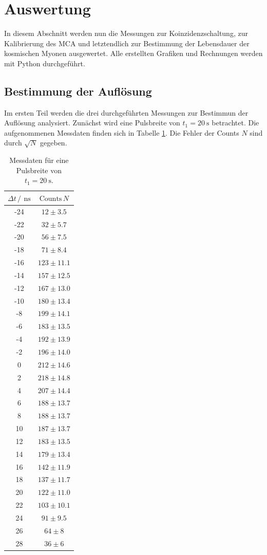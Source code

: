\section{Auswertung}
\label{sec:Auswertung}
In diesem Abschnitt werden nun die Messungen zur Koinzidenzschaltung, zur Kalibrierung des MCA und letztendlich zur Bestimmung der Lebensdauer der kosmischen Myonen ausgewertet.
Alle erstellten Grafiken und Rechnungen werden mit Python \cite{python} durchgeführt.
\subsection{Bestimmung der Auflösung}
Im ersten Teil werden die drei durchgeführten Messungen zur Bestimmun der Auflösung analysiert. Zunächst wird eine Pulsbreite von $t_\mathrm{1}=\SI{20}{\second}$ betrachtet.
Die aufgenommenen Messdaten finden sich in Tabelle \ref{tab:tab1}. Die Fehler der Counts $N$ sind durch $\sqrt{N}$ gegeben.
\begin{table}
  \centering
  \caption{Messdaten für eine Pulsbreite von $t_\mathrm{1}=\SI{20}{\second}$.}
  \label{tab:tab1}
  \begin{tabular}{c c}
    \toprule
		$\Delta t\, / \, \SI{}{\nano\second}$ & $\mathrm{Counts} \, N$ \\
    \midrule
    -24 & $12\pm3.5$ \\
		-22 & $32\pm5.7$ \\
		-20 & $56\pm7.5$ \\
		-18 & $71\pm8.4$ \\
		-16 & $123\pm11.1$ \\
		-14 & $157\pm12.5$ \\
		-12 & $167\pm13.0$ \\
		-10 & $180\pm13.4$ \\
		-8 & $199\pm14.1$ \\
		-6 & $183\pm13.5$ \\
		-4 & $192\pm13.9$ \\
		-2 & $196\pm14.0$ \\
		0  & $212\pm14.6$ \\
		2 & $218\pm14.8$ \\
		4 & $207\pm14.4$ \\
		6 & $188\pm13.7$ \\
		8 & $188\pm13.7$ \\
		10 & $187\pm13.7$ \\
		12 & $183\pm13.5$ \\
		14 & $179\pm13.4$ \\
		16 & $142\pm11.9$ \\
		18 & $137\pm11.7$ \\
		20 & $122\pm11.0$ \\
		22 & $103\pm10.1$ \\
		24 & $91\pm9.5$ \\
		26 & $64\pm8$ \\
		28 & $36\pm6$ \\
    \bottomrule
  \end{tabular}
\end{table}
